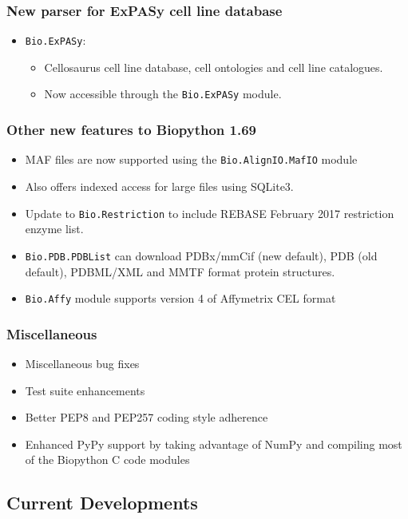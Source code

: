 \documentclass[trans]{beamer}
\begin{document}
\frame
{
  \frametitle{New parser for ExPASy cell line database}

  \begin{itemize}
  \item \texttt{Bio.ExPASy}:
  \begin{itemize}
  \item Cellosaurus cell line database, cell ontologies and cell line catalogues.
  \item Now accessible through the \texttt{Bio.ExPASy} module.
  \end{itemize}
  \end{itemize}
}
\frame
{
  \frametitle{Other new features to Biopython 1.69}
  \begin{itemize}
  \item MAF files are now supported using the \texttt{Bio.AlignIO.MafIO} module
  \item Also offers indexed access for large files using SQLite3.
  \item Update to \texttt{Bio.Restriction} to include REBASE February 2017 restriction enzyme list.
  \item \texttt{Bio.PDB.PDBList} can download PDBx/mmCif (new default), PDB (old default), PDBML/XML and MMTF format protein structures.
  \item \texttt{Bio.Affy} module supports version 4 of Affymetrix CEL format
  \end{itemize}

}


\frame
{
  \frametitle{Miscellaneous}

  \begin{itemize}
  \item Miscellaneous bug fixes
  \item Test suite enhancements
  \item Better PEP8 and PEP257 coding style adherence
  \item Enhanced PyPy support by taking
advantage of NumPy and compiling most of the Biopython C code modules
  \end{itemize}
}


\subsection*{Current Developments}
\frame
{
}
\end{document}
